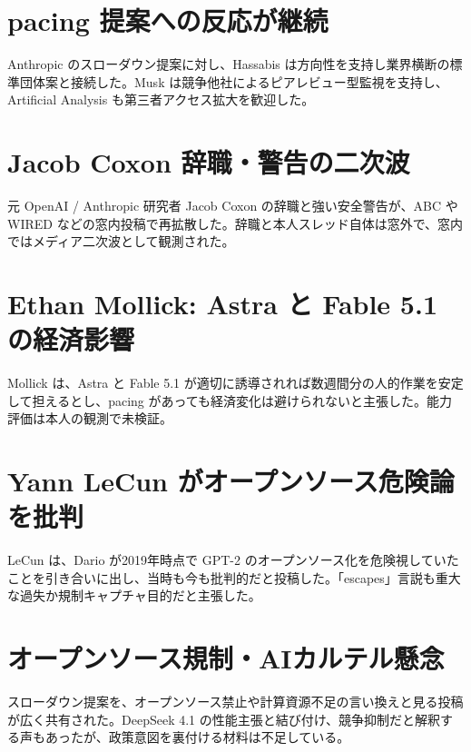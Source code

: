 \section{pacing 提案への反応が継続}
Anthropic のスローダウン提案に対し、Hassabis は方向性を支持し業界横断の標準団体案と接続した。Musk は競争他社によるピアレビュー型監視を支持し、Artificial Analysis も第三者アクセス拡大を歓迎した。

\section{Jacob Coxon 辞職・警告の二次波}
元 OpenAI / Anthropic 研究者 Jacob Coxon の辞職と強い安全警告が、ABC や WIRED などの窓内投稿で再拡散した。辞職と本人スレッド自体は窓外で、窓内ではメディア二次波として観測された。

\section{Ethan Mollick: Astra と Fable 5.1 の経済影響}
Mollick は、Astra と Fable 5.1 が適切に誘導されれば数週間分の人的作業を安定して担えるとし、pacing があっても経済変化は避けられないと主張した。能力評価は本人の観測で未検証。

\section{Yann LeCun がオープンソース危険論を批判}
LeCun は、Dario が2019年時点で GPT-2 のオープンソース化を危険視していたことを引き合いに出し、当時も今も批判的だと投稿した。「escapes」言説も重大な過失か規制キャプチャ目的だと主張した。

\section{オープンソース規制・AIカルテル懸念}
スローダウン提案を、オープンソース禁止や計算資源不足の言い換えと見る投稿が広く共有された。DeepSeek 4.1 の性能主張と結び付け、競争抑制だと解釈する声もあったが、政策意図を裏付ける材料は不足している。

